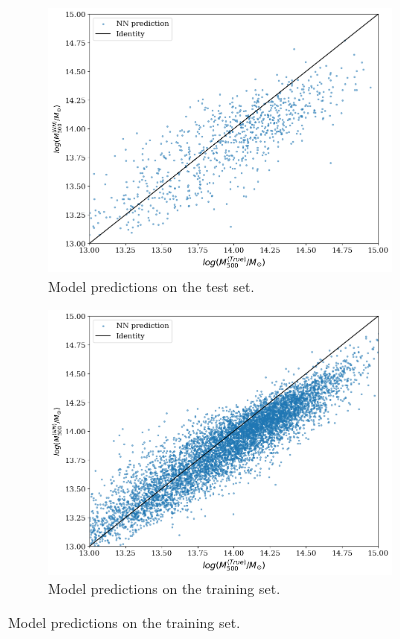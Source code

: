 \begin{figure}[H]
\centering
\begin{subfigure}{.46\textwidth}
  \centering
  \includegraphics[width=\linewidth]{images/Chapter4/Res101V2/res101v2_test.png}
  \caption{Model predictions on the test set.}
  \label{fig:best_perf_resnet101v2_a}
\end{subfigure}%
\hspace{.6em}
\begin{subfigure}{.46\textwidth}
  \centering
  \includegraphics[width=\linewidth]{images/Chapter4/Res101V2/res101v2_training.png}
  \caption{Model predictions on the training set.}
  \label{fig:best_perf_resnet101v2_b}
\end{subfigure}

\end{figure}
